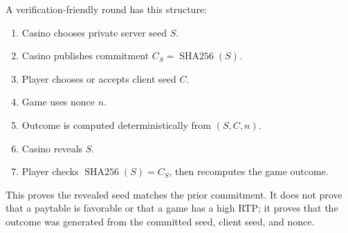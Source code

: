 \documentclass[11pt]{article}
\begin{document}
A verification-friendly round has this structure:

\begin{enumerate}
    \item Casino chooses private server seed \(S\).
    \item Casino publishes commitment \(C_S=\operatorname{SHA256}(S)\).
    \item Player chooses or accepts client seed \(C\).
    \item Game uses nonce \(n\).
    \item Outcome is computed deterministically from \((S,C,n)\).
    \item Casino reveals \(S\).
    \item Player checks \(\operatorname{SHA256}(S)=C_S\), then recomputes the game outcome.
\end{enumerate}

This proves the revealed seed matches the prior commitment. It does not prove that a paytable is favorable or that a game has a high RTP; it proves that the outcome was generated from the committed seed, client seed, and nonce.
\end{document}
